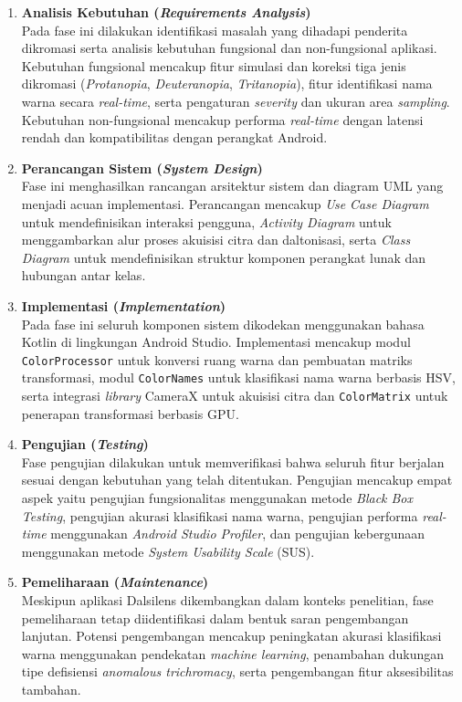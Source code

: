 \begin{enumerate}
  \item \textbf{Analisis Kebutuhan (\textit{Requirements Analysis})} \\
  Pada fase ini dilakukan identifikasi masalah yang dihadapi penderita dikromasi serta analisis kebutuhan fungsional dan non-fungsional aplikasi.
  Kebutuhan fungsional mencakup fitur simulasi dan koreksi tiga jenis dikromasi (\textit{Protanopia}, \textit{Deuteranopia}, \textit{Tritanopia}), fitur identifikasi nama warna secara \textit{real-time}, serta pengaturan \textit{severity} dan ukuran area \textit{sampling}.
  Kebutuhan non-fungsional mencakup performa \textit{real-time} dengan latensi rendah dan kompatibilitas dengan perangkat Android.

  \item \textbf{Perancangan Sistem (\textit{System Design})} \\
  Fase ini menghasilkan rancangan arsitektur sistem dan diagram UML yang menjadi acuan implementasi.
  Perancangan mencakup \textit{Use Case Diagram} untuk mendefinisikan interaksi pengguna, \textit{Activity Diagram} untuk menggambarkan alur proses akuisisi citra dan daltonisasi, serta \textit{Class Diagram} untuk mendefinisikan struktur komponen perangkat lunak dan hubungan antar kelas.

  \item \textbf{Implementasi (\textit{Implementation})} \\
  Pada fase ini seluruh komponen sistem dikodekan menggunakan bahasa Kotlin di lingkungan Android Studio.
  Implementasi mencakup modul \texttt{ColorProcessor} untuk konversi ruang warna dan pembuatan matriks transformasi, modul \texttt{ColorNames} untuk klasifikasi nama warna berbasis HSV, serta integrasi \textit{library} CameraX untuk akuisisi citra dan \texttt{ColorMatrix} untuk penerapan transformasi berbasis GPU.

  \item \textbf{Pengujian (\textit{Testing})} \\
  Fase pengujian dilakukan untuk memverifikasi bahwa seluruh fitur berjalan sesuai dengan kebutuhan yang telah ditentukan.
  Pengujian mencakup empat aspek yaitu pengujian fungsionalitas menggunakan metode \textit{Black Box Testing}, pengujian akurasi klasifikasi nama warna, pengujian performa \textit{real-time} menggunakan \textit{Android Studio Profiler}, dan pengujian kebergunaan menggunakan metode \textit{System Usability Scale} (SUS).

  \item \textbf{Pemeliharaan (\textit{Maintenance})} \\
  Meskipun aplikasi Dalsilens dikembangkan dalam konteks penelitian, fase pemeliharaan tetap diidentifikasi dalam bentuk saran pengembangan lanjutan.
  Potensi pengembangan mencakup peningkatan akurasi klasifikasi warna menggunakan pendekatan \textit{machine learning}, penambahan dukungan tipe defisiensi \textit{anomalous trichromacy}, serta pengembangan fitur aksesibilitas tambahan.
\end{enumerate}

